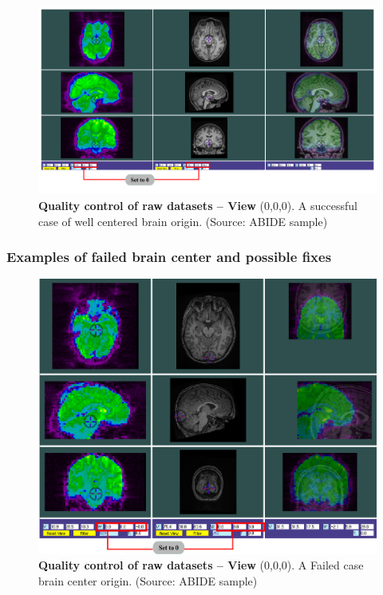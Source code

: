 \documentclass[12pt]{paper}%
\begin{document}
 
\begin{figure}[htbp]
\begin{center}
\captionsetup{justification=centering,margin=2cm}
\includegraphics[width=1\linewidth]{fig_qc_raw_data_ok}
\caption{
{\textbf{Quality control of raw datasets -- View} ($0$,$0$,$0$).} {A successful case of well centered brain origin. (Source: ABIDE sample)}}
\label{fig_qc_raw_data_ok}
\end{center}
\end{figure}

\newpage
\subsubsection{Examples of failed brain center and possible fixes}

\begin{figure}[htbp]
\captionsetup{justification=centering,margin=2cm}
\begin{center}
\includegraphics[width=1\linewidth]{fig_qc_raw_data_center_fail}
\caption{
{\textbf{Quality control of raw datasets -- View} ($0$,$0$,$0$).} {A Failed case brain center origin. (Source: ABIDE sample)}
}
\label{fig_qc_raw_data_center_fail}
\end{center}
\end{figure}
\end{document}
